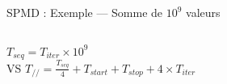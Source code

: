 \documentclass[../main.tex]{subfiles}
\begin{document}
\begin{frame}{SPMD : Exemple --- Somme de $10^9$ valeurs}
\begin{columns}
\begin{column}{.33\linewidth}
\begin{overlayarea}{\linewidth}{.85\textheight}
        $T_{seq} = T_{iter} \times 10^9$ \\
        VS
        $T_{//}  = \frac{T_{seq}}{4} + T_{start} + T_{stop} + 4 \times T_{iter}$ \\
      \end{overlayarea}
    \end{column}
    \begin{column}{.66\linewidth}
    \end{column}
  \end{columns}
\end{frame}
\end{document}
